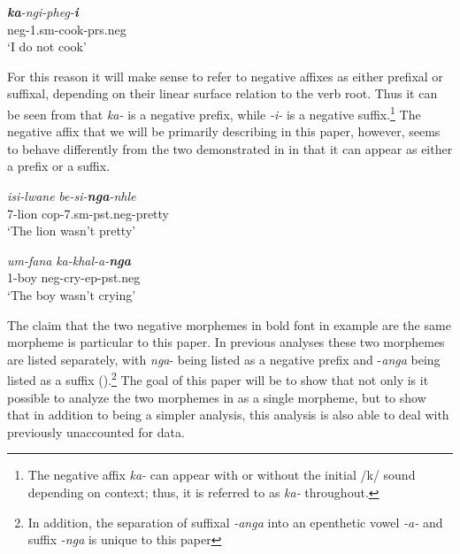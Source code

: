 \documentclass[output=paper]{langsci/langscibook}
\newcommand{\ii}[0]{\textit{-i- }}
\begin{document}
\begin{exe}
\ex \gll  \textit{\textbf {ka}-ngi-pheg-\textbf{i}}\\
          {\sc neg}-1.{\sc sm}-cook-{\sc prs.neg}\\
    \glt `I do not cook'
\end{exe}


For this reason it will make sense to refer to negative affixes as either prefixal or suffixal, depending on their linear surface relation to the verb root. Thus it can be seen from  that \textit{ka-} is a negative prefix, while \ii is a negative suffix.\footnote{The negative affix \textit{ka-} can appear with or without the initial /k/ sound depending on context; thus, it is referred to as \textit{ka-} throughout.} The negative affix that we will be primarily describing in this paper, however, seems to behave differently from the two demonstrated in  in that it can appear as either a prefix or a suffix.

\begin{exe}
\ex \begin{xlist}
\ex \gll \textit{isi-lwane}  \textit{be-si-\textbf{nga}-nhle}\\
       7-lion {\sc cop}-7.{\sc sm}-{\sc pst.neg}-pretty\\
    \glt `The lion wasn't pretty' 

\ex \gll \textit{um-fana} \textit{ka-khal-a-\textbf{nga}}\\
         1-boy {\sc neg}-cry-{\sc ep}-{\sc pst.neg}\\
    \glt `The boy wasn't crying'
\end{xlist}
\end{exe}

The claim that the two negative morphemes in bold font in example  are the same morpheme is particular to this paper. In previous analyses these two morphemes are listed separately, with \textit{nga}- being listed as a negative prefix and -\textit{anga} being listed as a suffix (\citealt{Sibanda2004,Khumalo1981,Kumalo1982}).\footnote{In addition, the separation of suffixal \textit{-anga} into an epenthetic vowel \textit{-a-} and suffix \textit{-nga} is unique to this paper} The goal of this paper will be to show that not only is it possible to analyze the two morphemes in  as a single morpheme, but to show that in addition to being a simpler analysis, this analysis is also able to deal with previously unaccounted for data.
\end{document}
